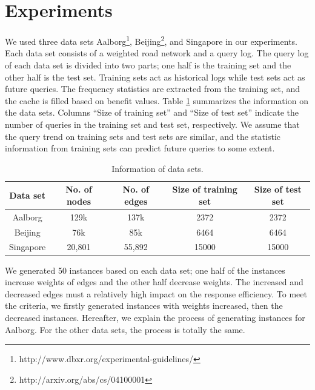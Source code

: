 \section{Experiments }
\label{sec:exp}

We used three data sets Aalborg\footnote{http://www.dbxr.org/experimental-guidelines/}, Beijing\footnote{http://arxiv.org/abs/cs/04100001}, and Singapore \citep{Song2014PRESS} in our experiments. Each data set consists of a weighted road network and a query log.
The query log of each data set is divided into two parts; one half is the training set and the other half is the test set. Training sets act as historical logs while test sets act as future queries. The frequency statistics are extracted from the training set, and the cache is filled based on benefit values.
Table \ref{tab:datasetinfo} summarizes the information on the data sets. Columns ``Size of training set'' and ``Size of test set'' indicate the number of queries in the training set and test set, respectively. We assume that the query trend on training sets and test sets are similar, and the statistic information from training sets can predict future queries to some extent.

 \begin{table}[htbp]
 \caption{Information of data sets.}
 \centering
 \label{tab:datasetinfo}
{
 \begin{tabular}{c|c|c|c|c}
 \hline
  Data set   & No. of nodes & No. of edges & Size of training set & Size of test set\\
  \hline
  Aalborg    & 129k         & 137k         &2372                            & 2372\\
  \hline
   Beijing   & 76k          &85k           &6464                            & 6464\\
  \hline
   Singapore & 20,801       &55,892        &15000                           & 15000\\
   \hline
 \end{tabular}
}
\end{table}

We generated 50 instances based on each data set; one half of the instances increase weights of edges and the other half decrease weights. The increased and decreased edges must a relatively high impact on the response efficiency.
To meet the criteria, we firstly generated instances with weights increased, then the decreased instances. Hereafter, we explain the process of generating instances for Aalborg. For the other data sets, the process is totally the same.

